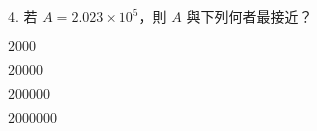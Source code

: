 \documentclass[12pt]{article}
\begin{document}
\begin{problem}
  \item[4.] 若 $A = 2.023 \times 10^5$，則 $A$ 與下列何者最接近？
  \begin{choices}
    \item $2000$
    \item $20000$
    \item $200000$
    \item $2000000$
  \end{choices}
\end{problem}
\end{document}
